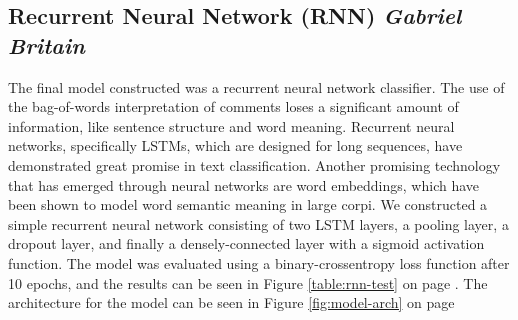\documentclass{article}
\begin{document}
{  \subsection{Recurrent Neural Network (RNN) \textit{Gabriel Britain}}{
	  The final model constructed was a recurrent neural network classifier. The
	  use of the bag-of-words interpretation of comments loses a significant
	  amount of information, like sentence structure and word meaning. Recurrent
	  neural networks, specifically LSTMs, which are designed for long sequences,
	  have demonstrated great promise in text classification. Another promising
	  technology that has emerged through neural networks are word embeddings,
	  which have been shown to model word semantic meaning in large corpi. We
	  constructed a simple recurrent neural network consisting of two LSTM layers,
	  a pooling layer, a dropout layer, and finally a densely-connected layer with
	  a sigmoid activation function. The model was evaluated using a
	  binary-crossentropy loss function after 10 epochs, and the results can be
	  seen in Figure \ref{table:rnn-test} on page \pageref{table:rnn-test}. The
	  architecture for the model can be seen in Figure \ref{fig:model-arch} on
	  page \pageref{fig:model-arch}

}}
\end{document}
